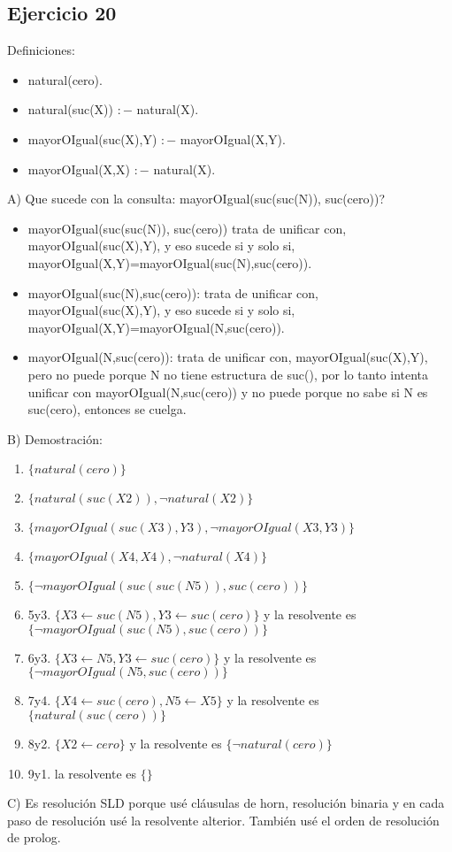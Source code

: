 \documentclass[10pt,a4paper]{article}
\begin{document}
\subsection{Ejercicio 20}
     Definiciones:
    \begin{itemize}
        \item natural(cero).
        \item natural(suc(X)) $:-$ natural(X).
        \item mayorOIgual(suc(X),Y) $:-$ mayorOIgual(X,Y).
        \item mayorOIgual(X,X) $:-$ natural(X).
    \end{itemize}
    A) Que sucede con la consulta: mayorOIgual(suc(suc(N)), suc(cero))?
    \begin{itemize}
        \item mayorOIgual(suc(suc(N)), suc(cero)) trata de unificar con, mayorOIgual(suc(X),Y), y eso sucede si y solo si, mayorOIgual(X,Y)=mayorOIgual(suc(N),suc(cero)).
        \item mayorOIgual(suc(N),suc(cero)): trata de unificar con, mayorOIgual(suc(X),Y), y eso sucede si y solo si, mayorOIgual(X,Y)=mayorOIgual(N,suc(cero)).
        \item mayorOIgual(N,suc(cero)): trata de unificar con, mayorOIgual(suc(X),Y), pero no puede porque N no tiene estructura de suc(), por lo tanto intenta unificar con mayorOIgual(N,suc(cero)) y no puede porque no sabe si N es suc(cero), entonces se cuelga. 
    \end{itemize}
    B) Demostración:
    \begin{enumerate}
    \item $\{natural(cero) \}$
    \item $\{natural(suc(X2)), \lnot natural(X2) \}$
    \item $\{mayorOIgual(suc(X3),Y3), \lnot mayorOIgual(X3,Y3) \}$
    \item $\{mayorOIgual(X4,X4), \lnot natural(X4) \}$
    \item $\{ \lnot mayorOIgual(suc(suc(N5)),suc(cero))\}$
    \item 5y3. $\{X3 \leftarrow suc(N5), Y3 \leftarrow suc(cero)\}$ y la resolvente es $\{ \lnot mayorOIgual(suc(N5),suc(cero))\}$
    \item 6y3. $\{X3 \leftarrow N5, Y3 \leftarrow suc(cero)\}$ y la resolvente es $\{ \lnot mayorOIgual(N5,suc(cero))\}$
    \item 7y4. $\{X4 \leftarrow suc(cero),N5 \leftarrow X5\}$ y la resolvente es $\{natural(suc(cero))\}$
    \item 8y2. $\{X2 \leftarrow cero\}$ y la resolvente es $\{ \lnot natural(cero)\}$
    \item 9y1. la resolvente es $\{\}$
    \end{enumerate}
    C) Es resolución SLD porque usé cláusulas de horn, resolución binaria y en cada paso de resolución usé la resolvente alterior. También usé el orden de resolución de prolog.
\end{document}
